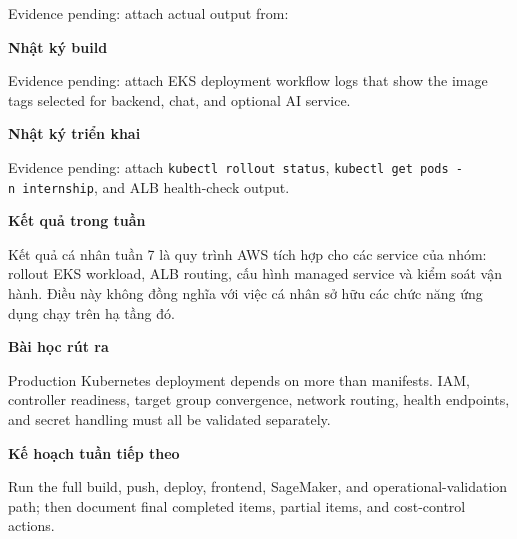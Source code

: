 Evidence pending: attach actual output from:

\begin{Shaded}
\begin{Highlighting}[]
 \OperatorTok{\textless{}}\OperatorTok{\textgreater{}}
\end{Highlighting}
\end{Shaded}

\vspace{0.5em}\noindent\textbf{Nhật ký build}\par

Evidence pending: attach EKS deployment workflow logs that show the
image tags selected for backend, chat, and optional AI service.

\vspace{0.5em}\noindent\textbf{Nhật ký triển
khai}\par

Evidence pending: attach \texttt{kubectl\ rollout\ status},
\texttt{kubectl\ get\ pods\ -n\ internship}, and ALB health-check
output.

\vspace{0.5em}\noindent\textbf{Kết quả trong tuần}\par

Kết quả cá nhân tuần 7 là quy trình AWS tích hợp cho các service của
nhóm: rollout EKS workload, ALB routing, cấu hình managed service và
kiểm soát vận hành. Điều này không đồng nghĩa với việc cá nhân sở hữu
các chức năng ứng dụng chạy trên hạ tầng đó.

\vspace{0.5em}\noindent\textbf{Bài học rút ra}\par

Production Kubernetes deployment depends on more than manifests. IAM,
controller readiness, target group convergence, network routing, health
endpoints, and secret handling must all be validated separately.

\vspace{0.5em}\noindent\textbf{Kế hoạch tuần tiếp
theo}\par

Run the full build, push, deploy, frontend, SageMaker, and
operational-validation path; then document final completed items,
partial items, and cost-control actions.

